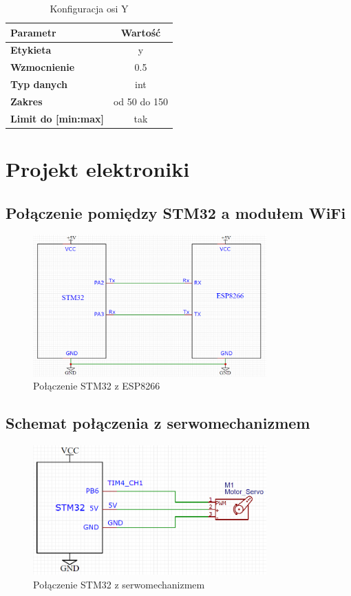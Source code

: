 \documentclass[10pt, a4paper]{article}
\begin{document}
	\begin{table}[H]
		\centering
		\begin{tabular}{|l|c|} 
			\hline
			\textbf{Parametr} & Wartość \\
			\hline
			 \textbf{Etykieta}&y  \\\hline
			\hline  \textbf{Wzmocnienie}&0.5  \\\hline
			\textbf{Typ danych} & int\\\hline
			\textbf{Zakres} &  od 50 do 150\\
			\hline
			\textbf{Limit do [min:max]}& tak\\
			\hline
		\end{tabular}
		\caption{Konfiguracja osi Y}
		\label{tab:OsY}
	\end{table}

\section{Projekt elektroniki}
	\subsection{Połączenie pomiędzy STM32 a modułem WiFi}
		\begin{figure}[H]
			\centering
			\includegraphics[width=0.8\textwidth]{figures/uart.png}
			\caption{Połączenie STM32 z ESP8266}
			\label{fig:UART}
		\end{figure}
	
	\subsection{Schemat połączenia z serwomechanizmem}
	\begin{figure}[H]
		\centering
		\includegraphics[width=0.8\textwidth]{figures/servo.png}
		\caption{Połączenie STM32 z serwomechanizmem}
		\label{fig:Servo}
	\end{figure}
	
\end{document}
